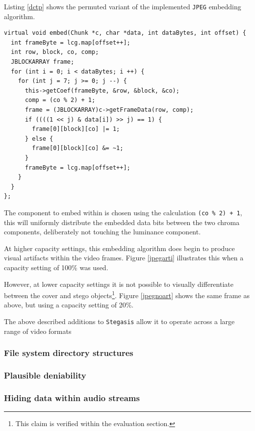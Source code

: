 \documentclass[paper=a4, fontsize=11pt,twoside]{scrartcl}    %
\numberwithin{table}{section}
\numberwithin{figure}{section}
\numberwithin{algorithm}{section}
\begin{document}
Listing \ref{dctp} shows the permuted variant of the implemented \texttt{JPEG} embedding algorithm.

\begin{lstlisting}[caption={Permuted \texttt{JPEG} embedding algorithm (\texttt{steg/dctp\_algorithm.cc:48}).}, frame=single, label=dctp,upquote=true]
virtual void embed(Chunk *c, char *data, int dataBytes, int offset) {
  int frameByte = lcg.map[offset++];
  int row, block, co, comp;
  JBLOCKARRAY frame; 
  for (int i = 0; i < dataBytes; i ++) {
    for (int j = 7; j >= 0; j --) {
      this->getCoef(frameByte, &row, &block, &co);
      comp = (co % 2) + 1;
      frame = (JBLOCKARRAY)c->getFrameData(row, comp);
      if ((((1 << j) & data[i]) >> j) == 1) {
        frame[0][block][co] |= 1;
      } else {
        frame[0][block][co] &= ~1;
      }
      frameByte = lcg.map[offset++];
    }
  }
};
\end{lstlisting}

The component to embed within is chosen using the calculation \texttt{(co \% 2) + 1}, this will uniformly distribute the embedded data bits between the two chroma components, deliberately not touching the luminance component. 

At higher capacity settings, this embedding algorithm does begin to produce visual artifacts within the video frames. Figure \ref{jpegarti} illustrates this when a capacity setting of 100\% was used.


However, at lower capacity settings it is not possible to visually differentiate between the cover and stego objects\footnote{This claim is verified within the evaluation section.}. Figure \ref{jpegnoart} shows the same frame as above, but using a capacity setting of 20\%.

\noindent
The above described additions to \texttt{Stegasis} allow it to operate across a large range of video formats 

\vfill

\subsubsection{File system directory structures}
\subsubsection{Plausible deniability}
\subsubsection{Hiding data within audio streams}
\end{document}
